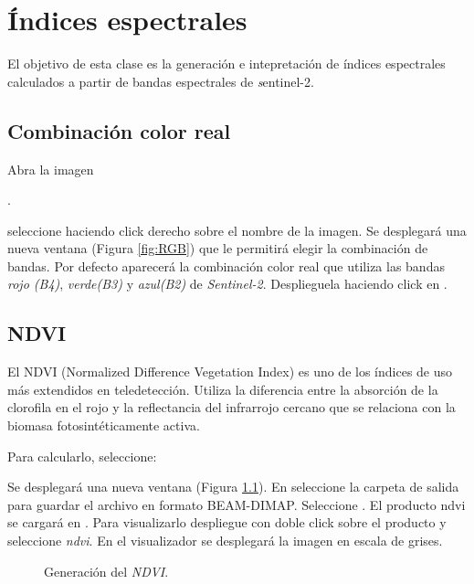 \chapter{Índices espectrales}

El objetivo de esta clase es la generación e intepretación de índices espectrales calculados a partir de bandas espectrales de \emph sentinel-2.


\section{Combinación color real}\label{sec:colorreal}

Abra la imagen \begin{center} .
\end{center} seleccione  haciendo click derecho sobre el nombre de la imagen. Se desplegará una nueva ventana (Figura \ref{fig:RGB}) que le permitirá elegir la combinación de bandas. Por defecto aparecerá la combinación color real que utiliza las bandas \emph{rojo (B4)}, \emph{verde(B3)} y \emph{azul(B2)} de \emph{Sentinel-2}. Desplieguela haciendo click en .

\section{NDVI}
El NDVI (Normalized Difference Vegetation Index) es uno de los índices de uso más extendidos en teledetección. Utiliza la diferencia entre la absorción de la clorofila en el rojo y la reflectancia del infrarrojo cercano que se relaciona con la biomasa fotosintéticamente activa.

Para calcularlo, seleccione:

\begin{center}
\end{center}

Se desplegará una nueva ventana (Figura \ref{fig:NDVI}). En  seleccione la carpeta de salida para guardar el archivo en formato BEAM-DIMAP. Seleccione . El producto ndvi se cargará en . Para visualizarlo despliegue con doble click sobre el producto  y seleccione \emph{ndvi}. En el visualizador se desplegará la imagen en escala de grises.

\begin{figure}[h!]
    \centering
    \hspace{1cm}
    \caption{Generación del \emph{NDVI}.}
    \label{fig:NDVI}
\end{figure}


